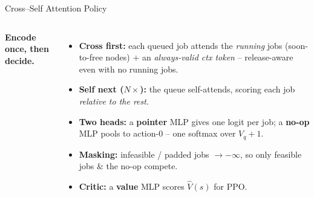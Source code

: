 \begin{frame}{Cross--Self Attention Policy}
\begin{columns}[T,onlytextwidth]
{}

    \footnotesize
    \textbf{Encode once, then decide.}
    \begin{itemize}\setlength\itemsep{3pt}
      \item \textbf{Cross first:} each queued job attends the \emph{running}
            jobs (soon-to-free nodes) $+$ an \emph{always-valid ctx token} --
            release-aware even with no running jobs.
      \item \textbf{Self next ($N\times$):} the queue self-attends, scoring
            each job \emph{relative to the rest}.
      \item \textbf{Two heads:} a \textbf{pointer} MLP gives one logit per job;
            a \textbf{no-op} MLP pools to action-0 -- one softmax over $V_q{+}1$.
      \item \textbf{Masking:} infeasible / padded jobs $\to -\infty$, so only
            feasible jobs \& the no-op compete.
      \item \textbf{Critic:} a \textbf{value} MLP scores $\hat V(s)$ for PPO.
    \end{itemize}


\end{columns}
\end{frame}
